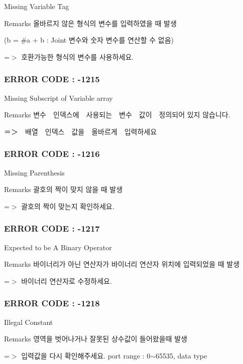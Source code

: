 Missing Variable Tag \begin{DoxyRemark}{Remarks}
올바르지 않은 형식의 변수를 입력하였을 때 발생 \par
 (b = \#a + b \-: Joint 변수와 숫자 변수를 연산할 수 없음) \par
 =$>$ 호환가능한 형식의 변수를 사용하세요.
\end{DoxyRemark}


 \subsubsection*{E\-R\-R\-O\-R C\-O\-D\-E \-: -\/1215 }

Missing Subscript of Variable array \begin{DoxyRemark}{Remarks}
변수　인덱스에　사용되는　변수　값이　정의되어 있지 않습니다. \par
 ＝＞　배열　인덱스　값을　올바르게　입력하세요
\end{DoxyRemark}


 \subsubsection*{E\-R\-R\-O\-R C\-O\-D\-E \-: -\/1216 }

Missing Parenthesis \begin{DoxyRemark}{Remarks}
괄호의 짝이 맞지 않을 때 발생 \par
 =$>$ 괄호의 짝이 맞는지 확인하세요.
\end{DoxyRemark}


 \subsubsection*{E\-R\-R\-O\-R C\-O\-D\-E \-: -\/1217 }

Expected to be A Binary Operator \begin{DoxyRemark}{Remarks}
바이너리가 아닌 연산자가 바이너리 연산자 위치에 입력되었을 때 발생 \par
 =$>$ 바이너리 연산자로 수정하세요.
\end{DoxyRemark}


 \subsubsection*{E\-R\-R\-O\-R C\-O\-D\-E \-: -\/1218 }

Illegal Constant \begin{DoxyRemark}{Remarks}
영역을 벗어나거나 잘못된 상수값이 들어왔을때 발생\par
 =$>$ 입력값을 다시 확인해주세요. port range \-: 0$\sim$65535, data type
\end{DoxyRemark}


